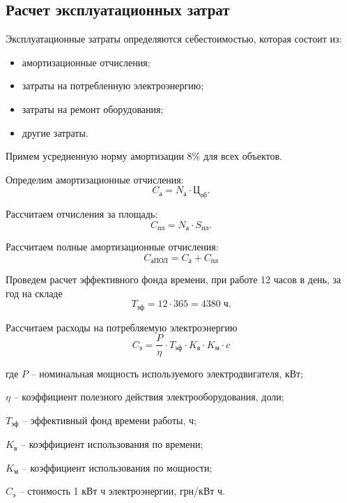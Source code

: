     \subsection{Расчет эксплуатационных затрат}

        Эксплуатационные затраты определяются себестоимостью, которая состоит
        из:
        \begin{itemize}
            \item амортизационные отчисления;
            \item затраты на потребленную электроэнергию;
            \item затраты на ремонт оборудования;
            \item другие затраты.
        \end{itemize}

        Примем усредненную норму амортизации 8\% для всех объектов.

        Определим амортизационные отчисления:
        \begin{equation}
            C_\text{а} = N_\text{а} \cdot \text{Ц}_\text{об}.
        \end{equation}

        Рассчитаем отчисления за площадь:
        \begin{equation}
            C_\text{пл} = N_\text{а} \cdot S_\text{пл}.
        \end{equation}

        Рассчитаем полные амортизационные отчисления:
        \begin{equation}
            C_\text{аПОЛ}  = C_\text{а} + C_\text{пл} 
        \end{equation}

        Проведем расчет эффективного фонда времени, при работе 12 часов в
        день, за год на складе
        \begin{equation}
            T_\text{эф} = 12 \cdot 365 = 4380 \; \text{ч}. 
        \end{equation}

        Рассчитаем расходы на потребляемую электроэнергию
        \begin{equation}
            C_\text{э} = \frac{P}{\eta} \cdot
                T_\text{эф} \cdot K_\text{в} \cdot K_\text{м} \cdot c 
        \end{equation}

        где  $P$ – номинальная мощность используемого
            электродвигателя, кВт;\par
        $\eta$ – коэффициент полезного действия электрооборудования,
            доли;\par
        $T_\text{эф}$ – эффективный фонд времени работы, ч;\par
        $K_\text{в}$ – коэффициент использования по времени;\par
        $K_\text{м}$ – коэффициент использования по мощности;\par
        $C_\text{э}$ – стоимость 1 кВт ч электроэнергии, грн/кВт ч.\par


